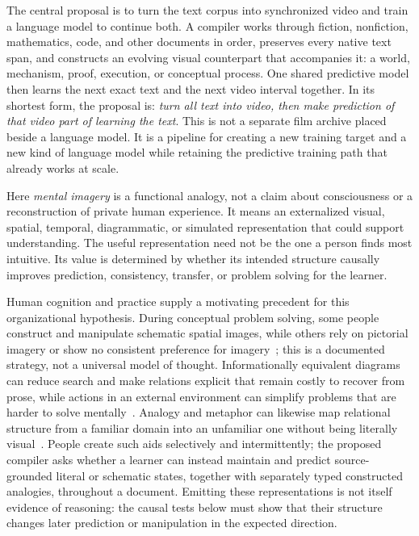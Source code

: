 \documentclass[11pt]{article}
\begin{document}
The central proposal is to turn the text corpus into synchronized video and train a language model to continue both. A compiler works through fiction, nonfiction, mathematics, code, and other documents in order, preserves every native text span, and constructs an evolving visual counterpart that accompanies it: a world, mechanism, proof, execution, or conceptual process. One shared predictive model then learns the next exact text and the next video interval together. In its shortest form, the proposal is: \emph{turn all text into video, then make prediction of that video part of learning the text}. This is not a separate film archive placed beside a language model. It is a pipeline for creating a new training target and a new kind of language model while retaining the predictive training path that already works at scale.

Here \emph{mental imagery} is a functional analogy, not a claim about consciousness or a reconstruction of private human experience. It means an externalized visual, spatial, temporal, diagrammatic, or simulated representation that could support understanding. The useful representation need not be the one a person finds most intuitive. Its value is determined by whether its intended structure causally improves prediction, consistency, transfer, or problem solving for the learner.

Human cognition and practice supply a motivating precedent for this organizational hypothesis. During conceptual problem solving, some people construct and manipulate schematic spatial images, while others rely on pictorial imagery or show no consistent preference for imagery~\cite{kozhevnikov2002visualizer}; this is a documented strategy, not a universal model of thought. Informationally equivalent diagrams can reduce search and make relations explicit that remain costly to recover from prose, while actions in an external environment can simplify problems that are harder to solve mentally~\cite{larkin1987diagram,kirsh1994epistemic}. Analogy and metaphor can likewise map relational structure from a familiar domain into an unfamiliar one without being literally visual~\cite{gentner1983structure}. People create such aids selectively and intermittently; the proposed compiler asks whether a learner can instead maintain and predict source-grounded literal or schematic states, together with separately typed constructed analogies, throughout a document. Emitting these representations is not itself evidence of reasoning: the causal tests below must show that their structure changes later prediction or manipulation in the expected direction.
\end{document}
